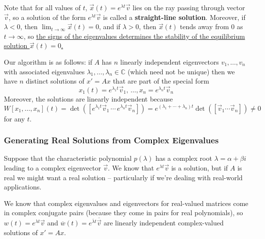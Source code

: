 \documentclass[12pt]{article}
\newcommand{\C}{\mathbb{C}}
\begin{document}
\begin{comment}
Suppose that $\lambda$ is a real eigenvalue for $A$ with real eigenvector $\vec{v}$, and consider the vector function $$x(t) = e^{\lambda t}\vec{v}$$ Then $x' = \lambda e^{\lambda t}\vec{v}$ and $Ax = A(e^{\lambda t}\vec{v}) = e^{\lambda t}A\vec{v} = e^{\lambda t}\lambda\vec{v}$, so $e^{\lambda t}\vec{v}$ is a solution of $x' = Ax$.
\end{comment}

Note that for all values of $t$, $\vec{x}(t) = e^{\lambda t}\vec{v}$ lies on the ray passing through vector $\vec{v}$, so a solution of the form $e^{\lambda t}\vec{v}$ is called a \textbf{straight-line solution}. Moreover, if $\lambda < 0$, then $\lim_{t \to \infty} \vec{x}(t) = 0$, and if $\lambda > 0$, then $\vec{x}(t)$ tends away from 0 as $t \to \infty$, so \uline{the signs of the eigenvalues determines the stability of the equilibrium solution $\vec{x}(t) = 0$.}

Our algorithm is as follows: if $A$ has $n$ linearly independent eigenvectors $v_1, \ldots, v_n$ with associated eigenvalues $\lambda_1, \ldots, \lambda_n \in \C$ (which need not be unique) then we have $n$ distinct solutions of $x' = Ax$ that are part of the special form $$x_1(t) = e^{\lambda_1 t}\vec{v}_1, \, \ldots, x_n = e^{\lambda_n t}\vec{v}_n$$ Moreover, the solutions are linearly independent because $$W[x_1, \ldots, x_n](t) = \det ([e^{\lambda_1 t}\vec{v}_1 \, \cdots \, e^{\lambda_n t}\vec{v}_n]) = e^{(\lambda_1 + \cdots + \lambda_n) t}\det ([\vec{v}_1 \cdots \vec{v}_n]) \neq 0$$ for any $t$.

\subsubsection{Generating Real Solutions from Complex Eigenvalues}

Suppose that the characteristic polynomial $p(\lambda)$ has a complex root $\lambda = \alpha + \beta i$ leading to a complex eigenvector $\vec{v}$. We know that $e^{\lambda t}\vec{v}$ is a solution, but if $A$ is real we might want a real solution -- particularly if we're dealing with real-world applications.

We know that complex eigenvalues and eigenvectors for real-valued matrices come in complex conjugate pairs (because they come in pairs for real polynomials), so $w(t) = e^{\lambda t}\vec{v}$ and $\overline{w}(t) = e^{\overline{\lambda}t}\overline{\vec{v}}$ are linearly independent complex-valued solutions of $x' = Ax$.
\end{document}
